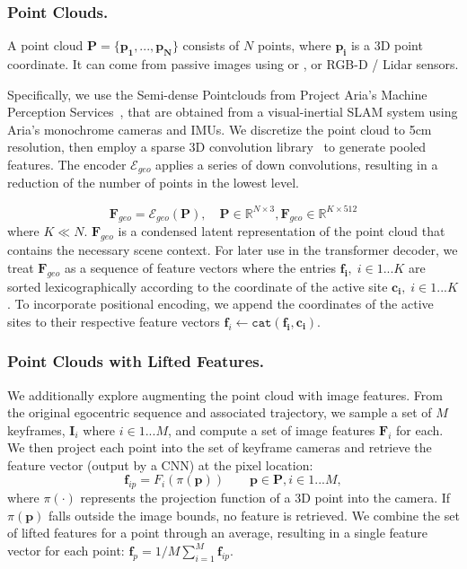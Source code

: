 \subsubsection{Point Clouds.}
\label{sec:encoder-points-only}

A point cloud 
$\mathbf{P} = \{\mathbf{p_1}, ..., \mathbf{p_N}\}$
consists of $N$ points,
where $\mathbf{p_i}$ is a 3D point coordinate. It can come from passive images using \SLAM{} or \SfM{}, or RGB-D / Lidar sensors.

Specifically, we use the Semi-dense Pointclouds from Project Aria's Machine Perception Services~\cite{aria_white_paper},
that are obtained from a visual-inertial SLAM system using Aria's monochrome cameras and IMUs. We discretize the point cloud to 5cm resolution, then employ a sparse 3D convolution library~\cite{tang2022torchsparse,tang2020searching} to generate pooled features. The encoder $\mathcal{E}_{geo}$ applies a series of down convolutions, resulting in a reduction of the number of points in the lowest level. 

\begin{equation}
\mathbf{F}_{geo} = \mathcal{E}_{geo}(\mathbf{P}), \quad \mathbf{P} \in \mathbb{R}^{N \times 3}, \mathbf{F}_{geo} \in \mathbb{R}^{K \times 512}
\end{equation}
where $K \ll N$. $\mathbf{F}_{geo}$ is a condensed latent representation of the point cloud that contains the necessary scene context. For later use in the transformer decoder, we treat $\mathbf{F}_{geo}$ as a sequence of feature vectors where the entries $\mathbf{f_i},\; i \in {1 ... K}$ are sorted lexicographically according to the coordinate of the active site $\mathbf{c_i},\; i \in {1 ... K}$. To incorporate positional encoding, we append the coordinates of the active sites to their respective feature vectors $\mathbf{f}_i \leftarrow \texttt{cat}(\mathbf{f_i}, \mathbf{c_i})$. 






\subsubsection{Point Clouds with Lifted Features.}

We additionally explore augmenting the point cloud with image features. From the original egocentric sequence and associated trajectory, we sample a set of $M$ keyframes, $\mathbf{I}_i$ where $i \in {1 ... M}$, and compute a set of image features $\mathbf{F}_i$ for each. We then project each point into the set of keyframe cameras and retrieve the feature vector (output by a CNN) at the pixel location:
\begin{equation}
    \mathbf{f}_{ip} = F_i(\pi(\mathbf{p})) \qquad \mathbf{p}\in\mathbf{P}, i \in {1 ... M},
\end{equation}
where $\pi(\cdot)$ represents the projection function of a 3D point into the camera. If $\pi(\mathbf{p})$ falls outside the image bounds, no feature is retrieved. We combine the set of lifted features for a point through an average, resulting in a single feature vector for each point: 
$\mathbf{f}_p = 1/M\sum_{i=1}^{M}{\mathbf{f}_{ip}}$.

